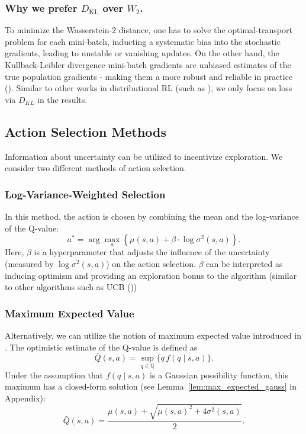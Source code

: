 \documentclass[11pt,a4paper]{report}
\begin{document}
\sloppy
\subsubsection*{Why we prefer $D_{\mathrm{KL}}$ over $W_2$.}
To minimize the Wasserstein-2 distance, one has to solve the optimal-transport problem for each mini-batch, inducting a systematic bias into the stochastic gradients, leading to unstable or vanishing updates. On the other hand, the Kullback-Leibler divergence mini-batch gradients are unbiased estimates of the true population gradients - making them a more robust and reliable in practice (\cite{bellemare2017cramer}). Similar to other works in distributional RL (such as \cite{bellemare2017}), we only focus on loss via $D_{KL}$ in the results.

\subsection{Action Selection Methods}

Information about uncertainty can be utilized to incentivize exploration. We consider two different methods of action selection.

\subsubsection{Log-Variance-Weighted Selection}
In this method, the action is chosen by combining the mean and the log-variance of the Q-value:
\[
  a^* = \arg\max_{a} \left\{ \mu(s, a) + \beta \cdot \log \sigma^2(s, a) \right\}.
\]
Here, \(\beta\) is a hyperparameter that adjusts the influence of the uncertainty (measured by \(\log \sigma^2(s,a)\)) on the action selection. $\beta$ can be interpreted as inducing optimism and providing an exploration bonus to the algorithm (similar to other algorithms such as UCB (\cite{peter2003})) 


\subsubsection{Maximum Expected Value}

\sloppy
Alternatively, we can utilize the notion of maximum expected value introduced in \cite{thomas2025}. The optimistic estimate of the Q-value is defined as
\[
  \bar{Q}(s,a) = \sup_{q \in \mathbb{Q}} \{ q \, f(q \mid s,a) \}.
\]
Under the assumption that \(f(q \mid s,a)\) is a Gaussian possibility function, this maximum has a closed-form solution (see Lemma~\ref{lem:max_expected_gauss} in Appendix):
\[
  \bar{Q}(s,a) = \frac{\mu(s,a) + \sqrt{\mu(s,a)^2 + 4\sigma^2(s,a)}}{2}.
\]
\end{document}
